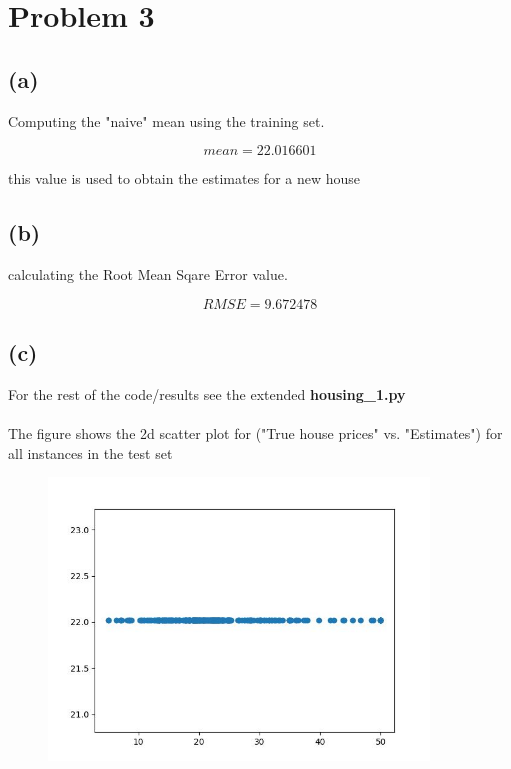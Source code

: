 \section{Problem 3}
\subsection{(a)} 
Computing the "naive" mean using the training set.

$$mean = 22.016601$$

this value is used to obtain the estimates for a new house
\subsection{(b)}
calculating the Root Mean Sqare Error value.

$$RMSE = 9.672478 $$
\subsection{(c)}
For the rest of the code/results see the extended \textbf{housing\_1.py}
\\
\\
The figure shows the 2d scatter plot for ("True house prices" vs. "Estimates") for all instances in the test set
\begin{figure}[H]
    \centering
    \includegraphics[width=0.9\textwidth]{Figures/Naive_regression.JPG}
\end{figure}
